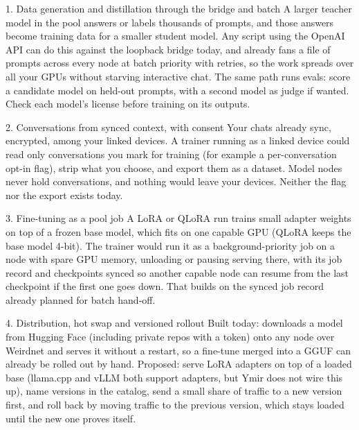 \begin{rowlist}
  \item[1. Data generation and distillation through the bridge and batch \status{Path built, use proposed}]
  A larger teacher model in the pool answers or labels thousands of prompts, and those answers become training data for a smaller student model. Any script using the OpenAI API can do this against the loopback bridge today, and  already fans a file of prompts across every node at batch priority with retries, so the work spreads over all your GPUs without starving interactive chat. The same path runs evals: score a candidate model on held-out prompts, with a second model as judge if wanted. Check each model's license before training on its outputs.

  \item[2. Conversations from synced context, with consent \status{Proposal}]
  Your chats already sync, encrypted, among your linked devices. A trainer running as a linked device could read only conversations you mark for training (for example a per-conversation opt-in flag), strip what you choose, and export them as a dataset. Model nodes never hold conversations, and nothing would leave your devices. Neither the flag nor the export exists today.

  \item[3. Fine-tuning as a pool job \status{Proposal}]
  A LoRA or QLoRA run trains small adapter weights on top of a frozen base model, which fits on one capable GPU (QLoRA keeps the base model 4-bit). The trainer would run it as a background-priority job on a node with spare GPU memory, unloading or pausing serving there, with its job record and checkpoints synced so another capable node can resume from the last checkpoint if the first one goes down. That builds on the synced job record already planned for batch hand-off.

  \item[4. Distribution, hot swap and versioned rollout \status{Partly built}]
  Built today:  downloads a model from Hugging Face (including private repos with a token) onto any node over Weirdnet and serves it without a restart, so a fine-tune merged into a GGUF can already be rolled out by hand. Proposed: serve LoRA adapters on top of a loaded base (llama.cpp and vLLM both support adapters, but Ymir does not wire this up), name versions in the catalog, send a small share of traffic to a new version first, and roll back by moving traffic to the previous version, which stays loaded until the new one proves itself.
\end{rowlist}

